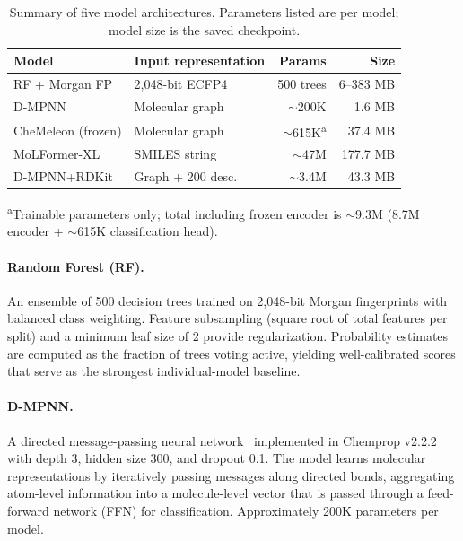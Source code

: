 \documentclass{article}
\begin{document}
\begin{table}[t]
\caption{Summary of five model architectures. Parameters listed are per model; model size is the saved checkpoint.}
\label{tab:architectures}
\vskip 0.1in
\centering
\scriptsize
\begin{tabular}{llrr}
\toprule
\textbf{Model} & \textbf{Input representation} & \textbf{Params} & \textbf{Size} \\
\midrule
RF + Morgan FP & 2,048-bit ECFP4 & 500 trees & 6--383 MB \\
D-MPNN & Molecular graph & ${\sim}$200K & 1.6 MB \\
CheMeleon (frozen) & Molecular graph & ${\sim}$615K\textsuperscript{a} & 37.4 MB \\
MoLFormer-XL & SMILES string & ${\sim}$47M & 177.7 MB \\
D-MPNN+RDKit & Graph + 200 desc. & ${\sim}$3.4M & 43.3 MB \\
\bottomrule
\end{tabular}
\vskip 0.05in
\raggedright\scriptsize\textsuperscript{a}Trainable parameters only; total including frozen encoder is ${\sim}$9.3M (8.7M encoder + ${\sim}$615K classification head).
\end{table}

\paragraph{Random Forest (RF).}
An ensemble of 500 decision trees trained on 2,048-bit Morgan fingerprints with balanced class weighting.
Feature subsampling (square root of total features per split) and a minimum leaf size of 2 provide regularization.
Probability estimates are computed as the fraction of trees voting active, yielding well-calibrated scores that serve as the strongest individual-model baseline.

\paragraph{D-MPNN.}
A directed message-passing neural network~\citep{yang2019} implemented in Chemprop v2.2.2~\citep{chemprop2024} with depth 3, hidden size 300, and dropout 0.1.
The model learns molecular representations by iteratively passing messages along directed bonds, aggregating atom-level information into a molecule-level vector that is passed through a feed-forward network (FFN) for classification.
Approximately 200K parameters per model.
\end{document}
